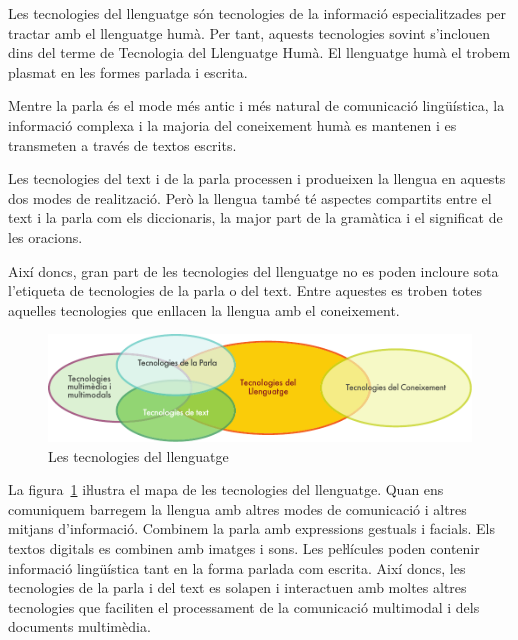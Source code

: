 \begin{multicols}{2}

Les tecnologies del llenguatge són tecnologies de la informació especialitzades per tractar amb el llenguatge humà. Per tant, aquests tecnologies sovint s’inclouen dins del terme de Tecnologia del Llenguatge Humà. El llenguatge humà el trobem plasmat en les formes parlada i escrita. 

Mentre la parla és el mode més antic i més natural de comunicació lingüística, la informació complexa i la majoria del coneixement humà es mantenen i es transmeten a través de textos escrits. 

Les tecnologies del text i de la parla processen i produeixen la llengua en aquests dos modes de realització. Però la llengua també té aspectes compartits entre el text i la parla com els diccionaris, la major part de la gramàtica i el significat de les oracions. 

Així doncs, gran part de les tecnologies del llenguatge no es poden incloure sota l’etiqueta de tecnologies de la parla o del text. Entre aquestes es troben totes aquelles tecnologies que enllacen la llengua amb el coneixement.


\begin{figure}[htb]
  \center
  \includegraphics[width=\textwidth]{../_media/catalan/language_technologies}
  \caption{Les tecnologies del llenguatge}
  \label{fig:ltincontext_ca}
\end{figure}

 La figura~\ref{fig:ltincontext_ca} iŀlustra el mapa de les tecnologies del llenguatge. Quan ens comuniquem barregem la llengua amb altres modes de comunicació i altres mitjans d’informació. Combinem la parla amb expressions gestuals i facials. Els textos digitals es combinen amb imatges i sons. Les peŀlícules poden contenir informació lingüística tant en la forma parlada com escrita. Així doncs, les tecnologies de la parla i del text es solapen i interactuen amb moltes altres tecnologies que faciliten el processament de la comunicació multimodal i dels documents multimèdia.


\end{multicols}

